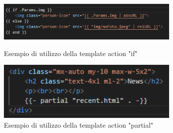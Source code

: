 \documentclass[target=bach,aauheader=]{thud}
\begin{document}
\begin{figure}[b]
    \centering
    \begin{minipage}{0.8\textwidth}
      \centering
      \includegraphics[width=0.8\textwidth]{images/if-template-actions.png}
      \caption{Esempio di utilizzo della template action "if"}
      \label{img:if}
    \end{minipage}
    \hspace{1cm}
    \hfill
    \begin{minipage}{0.5\textwidth}
      \centering
      \includegraphics[width=0.8\textwidth]{images/partial-template-actions.png}
      \caption{Esempio di utilizzo della template action "partial"}
      \label{img:partial}
    \end{minipage}
\end{figure}

\end{document}
